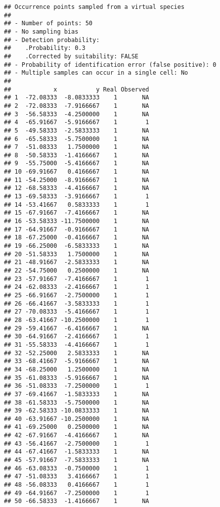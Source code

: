 \documentclass[]{article}
\begin{document}
\begin{verbatim}
## Occurrence points sampled from a virtual species
## 
## - Number of points: 50
## - No sampling bias
## - Detection probability: 
##    .Probability: 0.3
##    .Corrected by suitability: FALSE
## - Probability of identification error (false positive): 0
## - Multiple samples can occur in a single cell: No
## 
##            x           y Real Observed
## 1  -72.08333  -8.0833333    1       NA
## 2  -72.08333  -7.9166667    1       NA
## 3  -56.58333  -4.2500000    1       NA
## 4  -65.91667  -5.9166667    1        1
## 5  -49.58333  -2.5833333    1       NA
## 6  -65.58333  -5.7500000    1       NA
## 7  -51.08333   1.7500000    1       NA
## 8  -50.58333  -1.4166667    1       NA
## 9  -55.75000  -5.4166667    1       NA
## 10 -69.91667   0.4166667    1       NA
## 11 -54.25000  -8.9166667    1       NA
## 12 -68.58333  -4.4166667    1       NA
## 13 -69.58333  -3.9166667    1        1
## 14 -53.41667   0.5833333    1        1
## 15 -67.91667  -7.4166667    1       NA
## 16 -53.58333 -11.7500000    1       NA
## 17 -64.91667  -0.9166667    1       NA
## 18 -67.25000  -0.4166667    1       NA
## 19 -66.25000  -6.5833333    1       NA
## 20 -51.58333   1.7500000    1       NA
## 21 -48.91667  -2.5833333    1       NA
## 22 -54.75000   0.2500000    1       NA
## 23 -57.91667  -7.4166667    1        1
## 24 -62.08333  -2.4166667    1        1
## 25 -66.91667  -2.7500000    1        1
## 26 -66.41667  -3.5833333    1        1
## 27 -70.08333  -5.4166667    1        1
## 28 -63.41667 -10.2500000    1        1
## 29 -59.41667  -6.4166667    1       NA
## 30 -64.91667  -2.4166667    1        1
## 31 -55.58333  -4.4166667    1        1
## 32 -52.25000   2.5833333    1       NA
## 33 -68.41667  -5.9166667    1       NA
## 34 -68.25000   1.2500000    1       NA
## 35 -61.08333  -5.9166667    1       NA
## 36 -51.08333  -7.2500000    1        1
## 37 -69.41667  -1.5833333    1       NA
## 38 -61.58333  -5.7500000    1       NA
## 39 -62.58333 -10.0833333    1       NA
## 40 -63.91667 -10.2500000    1       NA
## 41 -69.25000   0.2500000    1       NA
## 42 -67.91667  -4.4166667    1       NA
## 43 -56.41667  -2.7500000    1        1
## 44 -67.41667  -1.5833333    1       NA
## 45 -57.91667  -7.5833333    1       NA
## 46 -63.08333  -0.7500000    1        1
## 47 -51.08333   3.4166667    1        1
## 48 -56.08333   0.4166667    1        1
## 49 -64.91667  -7.2500000    1        1
## 50 -66.58333  -1.4166667    1       NA
\end{verbatim}
\end{document}
